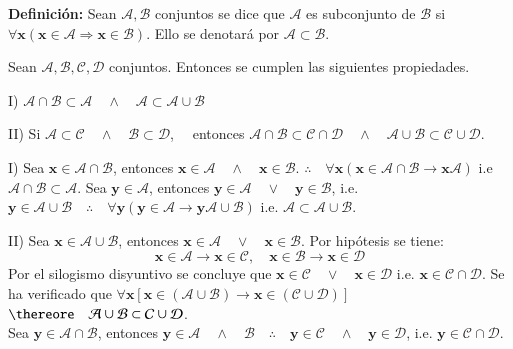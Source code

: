 \textbf{Definición:} Sean $\mathcal{A,B}$ conjuntos se dice que $\mathcal{A}$ es subconjunto de $\mathcal{B}$ si $\forall \mathbf{x}(\mathbf{x}\in\mathcal{A} \Longrightarrow \mathbf{x}\in\mathcal{B})$. Ello se denotará por $\mathcal{A}\subset\mathcal{B}$.\\

\begin{proposition}
Sean $\mathcal{A,B,C,D}$ conjuntos. Entonces se cumplen las siguientes propiedades. 
	\begin{iteritem}
	\item I) $\mathcal{A}\cap\mathcal{B} \subset \mathcal{A} \quad \wedge \quad \mathcal{A} \subset \mathcal{A}\cup\mathcal{B}$
	\item II) Si $\mathcal{A}\subset\mathcal{C}\quad\wedge\quad\mathcal{B}\subset\mathcal{D}$,$\quad$ entonces $\mathcal{A}\cap\mathcal{B}\subset\mathcal{C}\cap\mathcal{D}\quad\wedge\quad\mathcal{A}\cup\mathcal{B}\subset\mathcal{C}\cup\mathcal{D}$.
	\end{iteritem}
\end{proposition}
\begin{proof2}
	\begin{iteritem}
	\item I) Sea $\mathbf{x}\in\mathcal{A}\cap\mathcal{B}$, entonces $\mathbf{x}\in\mathcal{A} \quad\wedge\quad \mathbf{x}\in\mathcal{B}$.
		$\therefore\quad\forall\mathbf{x}(\mathbf{x}\in\mathcal{A}\cap\mathcal{B}\longrightarrow\mathbf{x}\mathcal{A})$ i.e $\mathcal{A}\cap\mathcal{B}\subset\mathcal{A}$. Sea $\mathbf{y}\in\mathcal{A}$, entonces $\mathbf{y}\in\mathcal{A}\quad\vee\quad\mathbf{y}\in\mathcal{B}$, i.e. $\mathbf{y}\in\mathcal{A}\cup\mathcal{B} \quad\therefore\quad\forall\mathbf{y}(\mathbf{y}\in\mathcal{A}\longrightarrow\mathbf{y}\mathcal{A}\cup\mathcal{B})$ i.e. $\mathcal{A}\subset\mathcal{A}\cup\mathcal{B}$. 
	\item II) Sea $\mathbf{x}\in\mathcal{A}\cup\mathcal{B}$, entonces $\mathbf{x}\in\mathcal{A}\quad\vee\quad\mathbf{x}\in\mathcal{B}$. Por hipótesis se tiene:
\[\mathbf{x}\in\mathcal{A}\longrightarrow\mathbf{x}\in\mathcal{C},\quad\mathbf{x}\in\mathcal{B}\longrightarrow\mathbf{x}\in\mathcal{D}\]
		Por el silogismo disyuntivo se concluye que $\mathbf{x}\in\mathcal{C}\quad\vee\quad\mathbf{x}\in\mathcal{D}$ i.e. $\mathbf{x}\in\mathcal{C}\cap\mathcal{D}$. Se ha verificado que $\forall\mathbf{x}[\mathbf{x}\in(\mathcal{A}\cup\mathcal{B})\longrightarrow\mathbf{x}\in(\mathcal{C}\cup\mathcal{D})]$ $\thereore \quad\mathcal{A}\cup\mathcal{B}\subset\mathcal{C}\cup\mathcal{D}$. \\

Sea $\mathbf{y}\in\mathcal{A}\cap\mathcal{B}$, entonces $\mathbf{y}\in\mathcal{A}\quad\wedge\quad\mathcal{B}\quad\therefore\quad\mathbf{y}\in\mathcal{C}\quad\wedge\quad\mathbf{y}\in\mathcal{D}$, i.e. $\mathbf{y}\in\mathcal{C}\cap\mathcal{D}$.
\end{iteritem}
\end{proof2}

